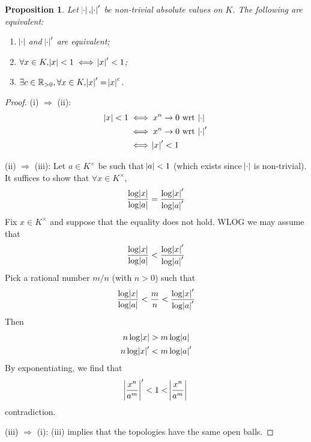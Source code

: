 \documentclass[11pt]{article}
\theoremstyle{definition}
\theoremstyle{plain}
\newtheorem{proposition}[definition]{Proposition}
\theoremstyle{remark}
\newcommand{\RR}{\mathbb{R}}
\begin{document}
\begin{proposition}\label{prop:1_3}
    Let $\abs{\cdot}, \abs{\cdot}'$ be non-trivial absolute values on $K$. The following are equivalent:
    \begin{enumerate}
        \item $\abs{\cdot}$ and $\abs{\cdot}'$ are equivalent;
        \item $\forall x \in K, \abs{x} < 1 \iff \abs{x}' < 1$;
        \item $\exists c \in \RR_{> 0}, \forall x \in K, \abs{x}' = \abs{x}^c$.
    \end{enumerate}
\end{proposition}
\begin{proof}
    (i) $\Rightarrow$ (ii):
    \begin{align*}
        \abs{x} < 1
        &\iff x^n \rightarrow 0 \text{ wrt } \abs{\cdot}\\
        &\iff x^n \rightarrow 0 \text{ wrt } \abs{\cdot}'\\
        &\iff \abs{x}' < 1
    \end{align*}

    \noindent(ii) $\Rightarrow$ (iii): Let $a \in K^\times$ be such that $\abs{a} < 1$ (which exists since $\abs{\cdot}$ is non-trivial). It suffices to show that $\forall x \in K^\times$,
    \begin{equation*}
        \frac{\log{\abs{x}}}{\log{\abs{a}}} = \frac{\log{\abs{x}'}}{\log{\abs{a}'}}
    \end{equation*}
    Fix $x \in K^\times$ and suppose that the equality does not hold. WLOG we may assume that
    \begin{equation*}
        \frac{\log{\abs{x}}}{\log{\abs{a}}} < \frac{\log{\abs{x}'}}{\log{\abs{a}'}}
    \end{equation*}
    Pick a rational number $m/n$ (with $n > 0$) such that
    \begin{equation*}
        \frac{\log{\abs{x}}}{\log{\abs{a}}} < \frac{m}{n} < \frac{\log{\abs{x}'}}{\log{\abs{a}'}}
    \end{equation*}
    Then
    \begin{align*}
        n \log{\abs{x}} &> m \log{\abs{a}} \\
        n \log{\abs{x}'} &< m \log{\abs{a}'}
    \end{align*}
    By exponentiating, we find that
    \begin{equation*}
        \abs{\frac{x^n}{a^m}}' < 1 < \abs{\frac{x^n}{a^m}}
    \end{equation*}
    contradiction.

    \noindent (iii) $\Rightarrow$ (i): (iii) implies that the topologies have the same open balls.
\end{proof}
\end{document}

